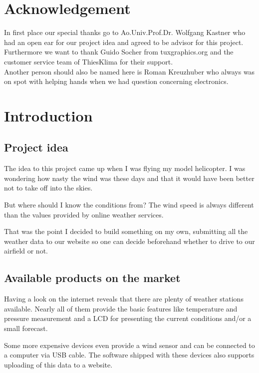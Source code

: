 
\chapter*{Acknowledgement}

In first place our special thanks go to Ao.Univ.Prof.Dr. Wolfgang Kastner who had an open ear for our project idea and agreed to be advisor for this project.\\[12pt]

\noindent Furthermore we want to thank Guido Socher from tuxgraphics.org and the customer service team of ThiesKlima for their support.\\[12pt]

\noindent Another person should also be named here is Roman Kreuzhuber who always was on spot with helping hands when we had question concerning electronics. 

\chapter{Introduction}

\section{Project idea}
The idea to this project came up when I was flying my model helicopter. I was wondering how nasty the wind was these days and that it would have been better not to take off into the skies.

But where should I know the conditions from? The wind speed is always different than the values provided by online weather services.

That was the point I decided to build something on my own, submitting all the weather data to our website so one can decide beforehand whether to drive to our airfield or not.

\section{Available products on the market}
Having a look on the internet reveals that there are plenty of weather stations available. Nearly all of them provide the basic features like temperature and pressure measurement and a LCD for presenting the current conditions and/or a small forecast.

Some more expensive devices even provide a wind sensor and can be connected to a computer via USB cable. The software shipped with these devices also supports uploading of this data to a website.

